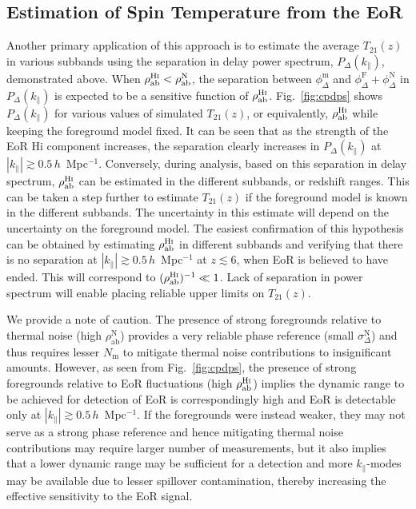 \documentclass[
reprint,
superscriptaddress,
amsmath,
amssymb,
aps,
prd
]{revtex4-1}
\begin{document}
\subsection{Estimation of Spin Temperature from the EoR}\label{sec:spin-temp}

Another primary application of this approach is to estimate the average $T_{21}(z)$ in various subbands using the separation in delay power spectrum, $P_\Delta(k_\parallel)$, demonstrated above. When $\rho_\textrm{ab}^\textrm{H{\sc i}} < \rho_\textrm{ab}^\textrm{N}$, the separation between $\phi_\Delta^\textrm{m}$ and $\phi_\Delta^\textrm{F} + \phi_\Delta^\textrm{N}$ in $P_\Delta(k_\parallel)$ is expected to be a sensitive function of $\rho_\textrm{ab}^\textrm{H{\sc i}}$. Fig.~\ref{fig:cpdps} shows $P_\Delta(k_\parallel)$ for various values of simulated $T_{21}(z)$, or equivalently, $\rho_\textrm{ab}^\textrm{H{\sc i}}$ while keeping the foreground model fixed. It can be seen that as the strength of the EoR H{\sc i} component increases, the separation clearly increases in $P_\Delta(k_\parallel)$ at $|k_\parallel| \gtrsim 0.5\,h$~Mpc$^{-1}$. Conversely, during analysis, based on this separation in delay spectrum, $\rho_\textrm{ab}^\textrm{H{\sc i}}$ can be estimated in the different subbands, or redshift ranges. This can be taken a step further to estimate $T_{21}(z)$ if the foreground model is known in the different subbands. The uncertainty in this estimate will depend on the uncertainty on the foreground model. The easiest confirmation of this hypothesis can be obtained by estimating $\rho_\textrm{ab}^\textrm{H{\sc i}}$ in different subbands and verifying that there is no separation at $|k_\parallel| \gtrsim 0.5\,h$~Mpc$^{-1}$ at $z\lesssim 6$, when EoR is believed to have ended. This will correspond to $(\rho_\textrm{ab}^\textrm{H{\sc i}})^{-1} \ll 1$. Lack of separation in power spectrum will enable placing reliable upper limits on $T_{21}(z)$.

We provide a note of caution. The presence of strong foregrounds relative to thermal noise (high $\rho_\textrm{ab}^\textrm{N}$) provides a very reliable phase reference (small $\sigma_\Delta^\textrm{N}$) and thus requires lesser $N_\textrm{m}$ to mitigate thermal noise contributions to insignificant amounts. However, as seen from Fig.~\ref{fig:cpdps}, the presence of strong foregrounds relative to EoR fluctuations (high $\rho_\textrm{ab}^\textrm{H{\sc i}}$) implies the dynamic range to be achieved for detection of EoR is correspondingly high and EoR is detectable only at $|k_\parallel| \gtrsim 0.5\,h$~Mpc$^{-1}$. If the foregrounds were instead weaker, they may not serve as a strong phase reference and hence mitigating thermal noise contributions may require larger number of measurements, but it also implies that a lower dynamic range may be sufficient for a detection and more $k_\parallel$-modes may be available due to lesser spillover contamination, thereby increasing the effective sensitivity to the EoR signal. 
\end{document}
